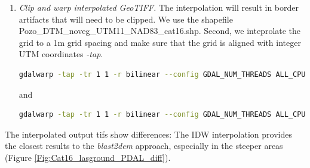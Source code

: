 \documentclass[a4paperpaper,,tablecaptionabove]{scrartcl}
\begin{document}
\begin{enumerate}
\begin{lstlisting}[language=bash]
gdal_grid --config GDAL_NUM_THREADS ALL_CPUS -of GTiff -co PREDICTOR=3 -co COMPRESS=DEFLATE -co ZLEVEL=7 -ot Float32 -txe $xmin $xmax -tye $ymin $ymax -zfield Z -a $linear -outsize $ncols $nrows -a_srs epsg:26911 Pozo_USGS_UTM11_NAD83_cat16_smrf_cl2.shp dtm_interp/Pozo_USGS_UTM11_NAD83_cat16_smrf_cl2_linear_1m.tif
\end{lstlisting}

  and

\begin{lstlisting}[language=bash]
gdal_grid -of GTiff -co PREDICTOR=3 -co COMPRESS=DEFLATE -co ZLEVEL=7 -ot Float32 -txe $xmin $xmax -tye $ymin $ymax -zfield Z -a $idw -outsize $ncols $nrows -a_srs epsg:26911 Pozo_USGS_UTM11_NAD83_cat16_smrf_cl2.shp dtm_interp/Pozo_USGS_UTM11_NAD83_cat16_smrf_cl2_idw_1m.tif
\end{lstlisting}
\item
  \emph{Clip and warp interpolated GeoTIFF.} The interpolation will
  result in border artifacts that will need to be clipped. We use the
  shapefile Pozo\_DTM\_noveg\_UTM11\_NAD83\_cat16.shp. Second, we
  inteprolate the grid to a 1m grid spacing and make sure that the grid
  is aligned with integer UTM coordinates \emph{-tap}.

\begin{lstlisting}[language=bash]
gdalwarp -tap -tr 1 1 -r bilinear --config GDAL_NUM_THREADS ALL_CPUS -co PREDICTOR=3 -co COMPRESS=DEFLATE -co ZLEVEL=7 -t_srs epsg:26911 -srcnodata -9999 -dstnodata -9999 -ot Float32 -crop_to_cutline -cutline Pozo_DTM_noveg_UTM11_NAD83_cat16.shp dtm_interp/Pozo_USGS_UTM11_NAD83_cat16_smrf_cl2_linear_1m.tif dtm_interp/Pozo_USGS_UTM11_NAD83_cat16_smrf_cl2_linear_1m_clip.tif
\end{lstlisting}

  and

\begin{lstlisting}[language=bash]
gdalwarp -tap -tr 1 1 -r bilinear --config GDAL_NUM_THREADS ALL_CPUS -co PREDICTOR=3 -co COMPRESS=DEFLATE -co ZLEVEL=7 -t_srs epsg:26911 -srcnodata -9999 -dstnodata -9999 -ot Float32 -crop_to_cutline -cutline Pozo_DTM_noveg_UTM11_NAD83_cat16.shp dtm_interp/Pozo_USGS_UTM11_NAD83_cat16_smrf_cl2_idw_1m.tif dtm_interp/Pozo_USGS_UTM11_NAD83_cat16_smrf_cl2_idw_1m_clip.tif
\end{lstlisting}
\end{enumerate}

The interpolated output tifs show differences: The IDW interpolation
provides the closest results to the \emph{blast2dem} approach,
especially in the steeper areas (Figure
\ref{Fig:Cat16_lasground_PDAL_diff}).
\end{document}
